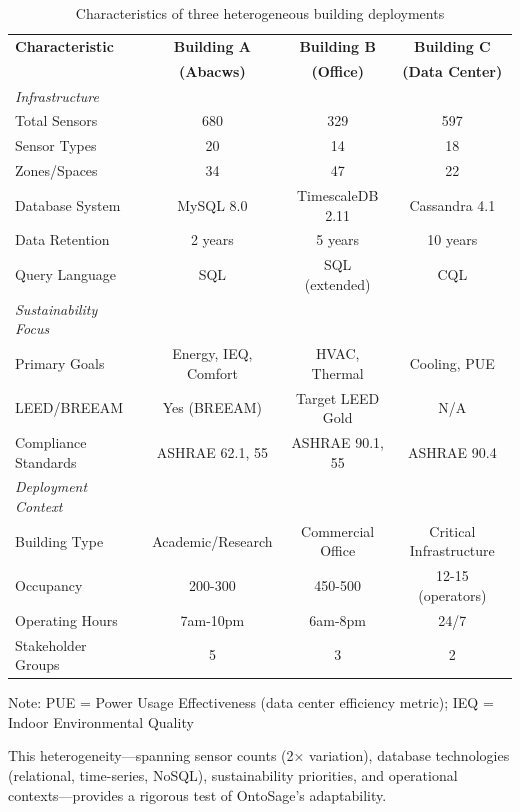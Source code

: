 \documentclass[acmlarge]{acmart}
\begin{document}
\begin{table}[h]
\centering
\begin{threeparttable}
\caption{Characteristics of three heterogeneous building deployments}
\label{tab:building-characteristics}
\small
\begin{tabular}{@{}lccc@{}}
\toprule
\textbf{Characteristic} & \textbf{Building A} & \textbf{Building B} & \textbf{Building C} \\
 & \textbf{(Abacws)} & \textbf{(Office)} & \textbf{(Data Center)} \\
\midrule
\textit{Infrastructure} & & & \\
Total Sensors & 680 & 329 & 597 \\
Sensor Types & 20 & 14 & 18 \\
Zones/Spaces & 34 & 47 & 22 \\
Database System & MySQL 8.0 & TimescaleDB 2.11 & Cassandra 4.1 \\
Data Retention & 2 years & 5 years & 10 years \\
Query Language & SQL & SQL (extended) & CQL \\
\midrule
\textit{Sustainability Focus} & & & \\
Primary Goals & Energy, IEQ, Comfort & HVAC, Thermal & Cooling, PUE \\
LEED/BREEAM & Yes (BREEAM) & Target LEED Gold & N/A \\
Compliance Standards & ASHRAE 62.1, 55 & ASHRAE 90.1, 55 & ASHRAE 90.4 \\
\midrule
\textit{Deployment Context} & & & \\
Building Type & Academic/Research & Commercial Office & Critical Infrastructure \\
Occupancy & 200-300 & 450-500 & 12-15 (operators) \\
Operating Hours & 7am-10pm & 6am-8pm & 24/7 \\
Stakeholder Groups & 5 & 3 & 2 \\
\bottomrule
\end{tabular}
\begin{tablenotes}
\small
\item Note: PUE = Power Usage Effectiveness (data center efficiency metric); IEQ = Indoor Environmental Quality
\end{tablenotes}
\end{threeparttable}
\end{table}

This heterogeneity—spanning sensor counts (2× variation), database technologies (relational, time-series, NoSQL), sustainability priorities, and operational contexts—provides a rigorous test of OntoSage's adaptability.
\end{document}
